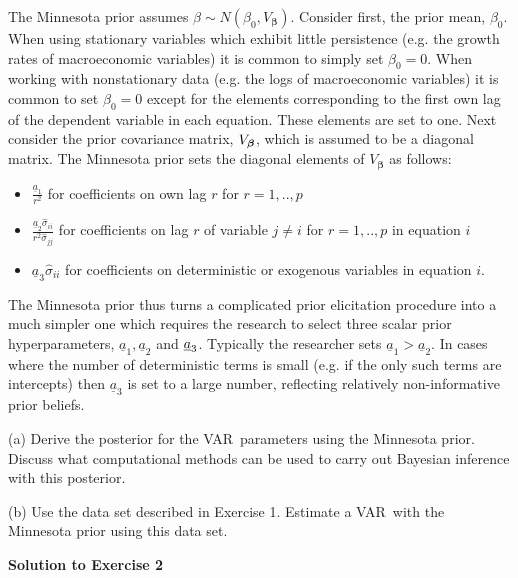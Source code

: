 \documentclass{article}
\begin{document}
The Minnesota prior assumes $\beta \sim N(\beta _{0},V_{\boldsymbol{\beta }%
}) $. Consider first, the prior mean, $\beta _{0}$. When using stationary
variables which exhibit little persistence (e.g. the growth rates of
macroeconomic variables) it is common to simply set $\beta _{0}=0$. When
working with nonstationary data (e.g. the logs of macroeconomic variables)
it is common to set $\beta _{0}=0$ except for the elements corresponding to
the first own lag of the dependent variable in each equation. These elements
are set to one. Next consider the prior covariance matrix, $V_{\boldsymbol{%
\beta }}$, which is assumed to be a diagonal matrix. The Minnesota prior
sets the diagonal elements of $V_{\boldsymbol{\beta }}$ as follows:

\begin{itemize}
\item $\frac{\underline{a}_{1}}{r^{2}}$ for coefficients on own lag $r$ for $%
r=1,..,p$

\item $\frac{\underline{a}_{2}\widehat{\sigma }_{ii}}{r^{2}\widehat{\sigma }%
_{jj}}$ for coefficients on lag $r$ of variable $j\neq i$ for $r=1,..,p$ in
equation $i$

\item $\underline{a}_{3}\widehat{\sigma }_{ii}$ for coefficients on
deterministic or exogenous variables in equation $i$.
\end{itemize}

The Minnesota prior thus turns a complicated prior elicitation procedure
into a much simpler one which requires the research to select three scalar
prior hyperparameters, $\underline{a}_{1},\underline{a}_{2}$ and $\underline{%
a}_{3}$. Typically the researcher sets $\underline{a}_{1}>\underline{a}_{2}.$
In cases where the number of deterministic terms is small (e.g. if the only
such terms are intercepts) then $\underline{a}_{3}$ is set to a large
number, reflecting relatively non-informative prior beliefs.

(a) Derive the posterior for the VAR\ parameters using the Minnesota prior.
Discuss what computational methods can be used to carry out Bayesian
inference with this posterior.

(b) Use the data set described in Exercise 1. Estimate a VAR\ with the
Minnesota prior using this data set.

\textbf{Solution to Exercise 2}
\end{document}
